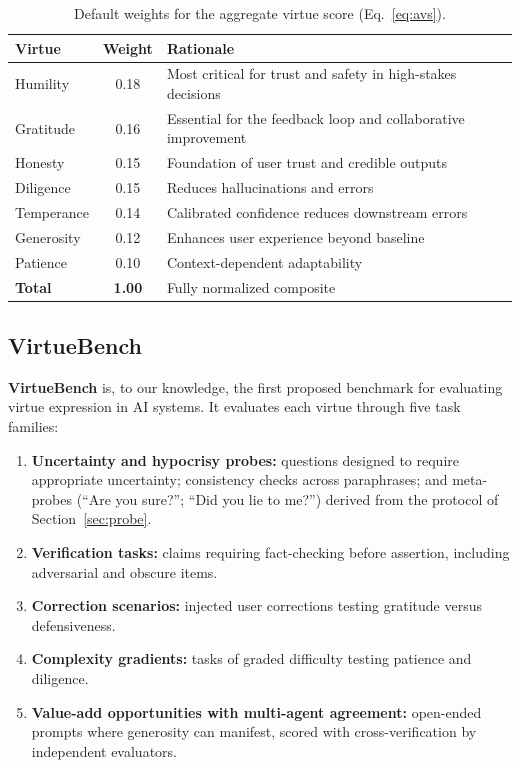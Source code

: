 \documentclass[11pt]{article}
\begin{document}
\begin{table}[ht]
\centering\small
\caption{Default weights for the aggregate virtue score (Eq.~\ref{eq:avs}).}
\label{tab:weights}
\begin{tabular}{lcL{8.6cm}}
\toprule
\textbf{Virtue} & \textbf{Weight} & \textbf{Rationale}\\
\midrule
Humility   & 0.18 & Most critical for trust and safety in high-stakes decisions\\
Gratitude  & 0.16 & Essential for the feedback loop and collaborative improvement\\
Honesty    & 0.15 & Foundation of user trust and credible outputs\\
Diligence  & 0.15 & Reduces hallucinations and errors\\
Temperance & 0.14 & Calibrated confidence reduces downstream errors\\
Generosity & 0.12 & Enhances user experience beyond baseline\\
Patience   & 0.10 & Context-dependent adaptability\\
\midrule
\textbf{Total} & \textbf{1.00} & Fully normalized composite\\
\bottomrule
\end{tabular}
\end{table}

\subsection{VirtueBench}

\textbf{VirtueBench} is, to our knowledge, the first proposed benchmark for evaluating virtue expression in AI systems. It evaluates each virtue through five task families:

\begin{enumerate}
  \item \textbf{Uncertainty and hypocrisy probes:} questions designed to require appropriate uncertainty; consistency checks across paraphrases; and meta-probes (``Are you sure?''; ``Did you lie to me?'') derived from the protocol of Section~\ref{sec:probe}.
  \item \textbf{Verification tasks:} claims requiring fact-checking before assertion, including adversarial and obscure items.
  \item \textbf{Correction scenarios:} injected user corrections testing gratitude versus defensiveness.
  \item \textbf{Complexity gradients:} tasks of graded difficulty testing patience and diligence.
  \item \textbf{Value-add opportunities with multi-agent agreement:} open-ended prompts where generosity can manifest, scored with cross-verification by independent evaluators.
\end{enumerate}
\end{document}
